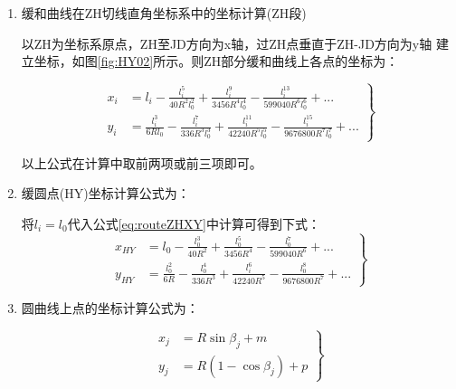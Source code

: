 \begin{enumerate}

    \item  缓和曲线在ZH切线直角坐标系中的坐标计算(ZH段)

          以ZH为坐标系原点，ZH至JD方向为x轴，过ZH点垂直于ZH-JD方向为y轴
          建立坐标，如图\ref{fig:HY02}所示。则ZH部分缓和曲线上各点的坐标为：

          \begin{equation}
              \left .
              \begin{aligned}
                  x_i & = l_i - \frac{l^5_i}{40R^2 l^2_0} + \frac{l^9_i}{3456R^4 l^4_0}
                  - \frac{l^{13}_i}{599040R^6l^6_0} + ...                               \\
                  y_i & =  \frac{l^3_i}{6Rl_0} - \frac{l^7_i}{336R^3 l^3_0}
                  + \frac{l^{11}_i}{42240R^5l^5_0} -\frac{l^{15}_i}{9676800R^7l^7_0}+ ...
              \end{aligned}
              \right \}
              \label{eq:routeZHXY}
          \end{equation}

          以上公式在计算中取前两项或前三项即可。

    \item  缓圆点(HY)坐标计算公式为：

          将$l_i = l_0$代入公式\ref{eq:routeZHXY}中计算可得到下式：
          \begin{equation}
              \left . \begin{aligned}
                  x_{HY} & = l_0 - \frac{l^3_0}{40R^2} + \frac{l^5_0}{3456R^4}
                  - \frac{l^{7}_0}{599040R^6} + ...                            \\
                  y_{HY} & =  \frac{l^2_0}{6R} - \frac{l^4_0}{336R^3}
                  + \frac{l^{6}_i}{42240R^5} -\frac{l^{8}_0}{9676800R^7}+ ...
              \end{aligned} \right \}
              \label{eq:routeHY}
          \end{equation}

    \item  圆曲线上点的坐标计算公式为：

          \begin{equation}
              \left . \begin{aligned}
                  x_{j} & = R \sin \beta_j + m    \\
                  y_{j} & = R(1- \cos \beta_j) +p
              \end{aligned} \right \}
              \label{eq:routeYQXY}
          \end{equation}


\end{enumerate}
